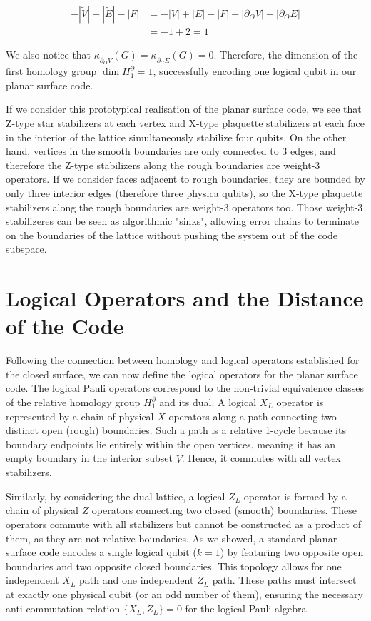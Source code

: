 \documentclass[12pt, twoside, openany]{book}
\begin{document}
\begin{align*}
    -|\tilde{V}| + |\tilde{E}| - |F| &= -|V| + |E| - |F| + |\partial_O V| - |\partial_O E|\\
    &=-1+2 = 1
\end{align*}

We also notice that $\kappa_{\overline{\partial_O V}}(G) = \kappa_{\overline{\partial_C E}}(G) = 0$. Therefore, the dimension of the first homology group $\dim H_1 ^\partial = 1$, successfully encoding one logical qubit in our planar surface code. 

If we consider this prototypical realisation of the planar surface code, we see that Z-type star stabilizers at each vertex and X-type plaquette stabilizers at each face in the interior of the lattice simultaneously stabilize four qubits. On the other hand, vertices in the smooth boundaries are only connected to 3 edges, and therefore the Z-type stabilizers along the rough boundaries are weight-3 operators. If we consider faces adjacent to rough boundaries, they are bounded by only three interior edges (therefore three physica qubits), so the X-type plaquette stabilizers along the rough boundaries are weight-3 operators too. Those weight-3 stabilizeres can be seen as algorithmic "sinks", allowing error chains to terminate on the boundaries of the lattice without pushing the system out of the code subspace. \\


\section{Logical Operators and the Distance of the Code}

Following the connection between homology and logical operators established for the closed surface, we can now define the logical operators for the planar surface code. The logical Pauli operators correspond to the non-trivial equivalence classes of the relative homology group $H_1^\partial$ and its dual. A logical $X_L$ operator is represented by a chain of physical $X$ operators along a path connecting two distinct open (rough) boundaries. Such a path is a relative 1-cycle because its boundary endpoints lie entirely within the open vertices, meaning it has an empty boundary in the interior subset $\tilde{V}$. Hence, it commutes with all vertex stabilizers. 

Similarly, by considering the dual lattice, a logical $Z_L$ operator is formed by a chain of physical $Z$ operators connecting two closed (smooth) boundaries. These operators commute with all stabilizers but cannot be constructed as a product of them, as they are not relative boundaries. As we showed, a standard planar surface code encodes a single logical qubit ($k=1$) by featuring two opposite open boundaries and two opposite closed boundaries. This topology allows for one independent $X_L$ path and one independent $Z_L$ path. These paths must intersect at exactly one physical qubit (or an odd number of them), ensuring the necessary anti-commutation relation $\{X_L, Z_L\} = 0$ for the logical Pauli algebra.
\end{document}

